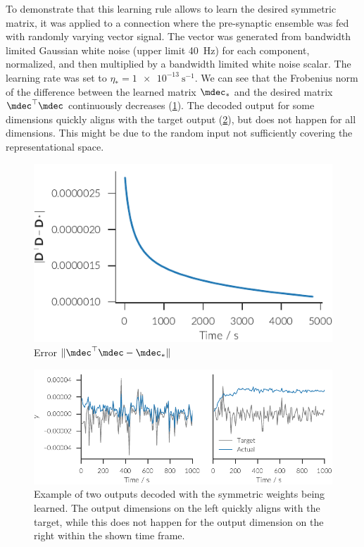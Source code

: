 To demonstrate that this learning rule allows to learn the desired symmetric matrix, it was applied to a connection where the pre-synaptic ensemble was fed with randomly varying vector signal.
The vector was generated from bandwidth limited Gaussian white noise (upper limit \SI{40}{\hertz}) for each component, normalized, and then multiplied by a bandwidth limited white noise scalar.
The learning rate was set to $\eta_* = \SI{1e-13}{\second^{-1}}$.
We can see that the Frobenius norm of the difference between the learned matrix $\mdec_*$ and the desired matrix $\mdec\Tr\mdec$ continuously decreases (\cref{fig:aml:grad-err}).
The decoded output for some dimensions quickly aligns with the target output (\cref{fig:aml:grad-decode}), but does not happen for all dimensions.
This might be due to the random input not sufficiently covering the representational space.
\begin{figure}
    \centering
    \includegraphics{figures/aml-grad-err}
    \caption{Error $\lVert \mdec\Tr\mdec - \mdec_*\rVert$}\label{fig:aml:grad-err}
\end{figure}
\begin{figure}
    \centering
    \includegraphics{figures/aml-decode}
    \caption[Example of two outputs decoded with the symmetric weights being learned]{Example of two outputs decoded with the symmetric weights being learned. The output dimensions on the left quickly aligns with the target, while this does not happen for the output dimension on the right within the shown time frame.}\label{fig:aml:grad-decode}
\end{figure}

